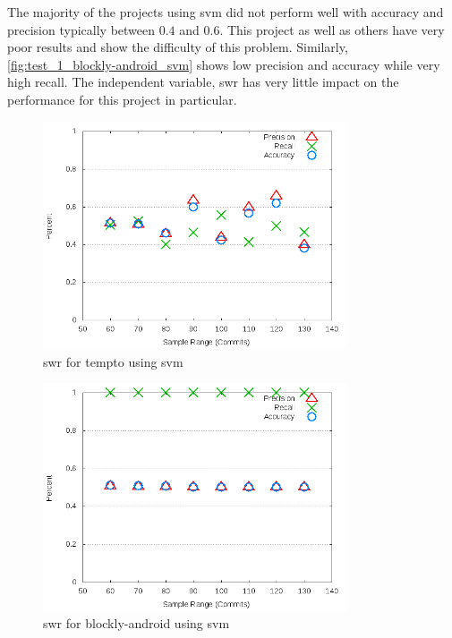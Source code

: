 

The majority of the projects using \gls{svm} did not perform well with accuracy and precision typically between $0.4$ and $0.6$. This project as well as others have very poor results and show the difficulty of this problem. Similarly, \autoref{fig:test_1_blockly-android_svm} shows low precision and accuracy while very high recall. The independent variable, \gls{swr} has very little impact on the performance for this project in particular.


\begin{figure}[!ht]
    \centering

        \includegraphics[width=0.8\textwidth]{images/svm/test_1/tempto_sample_range}
        \caption{\gls{swr} for tempto using \gls{svm}}
        \label{fig:test_1_tempto_svm}
\end{figure}

\begin{figure}[!ht]
    \centering

        \includegraphics[width=0.8\textwidth]{images/svm/test_1/blockly-android_sample_range}
        \caption{\gls{swr} for blockly-android using \gls{svm}}
        \label{fig:test_1_blockly-android_svm}
\end{figure}


